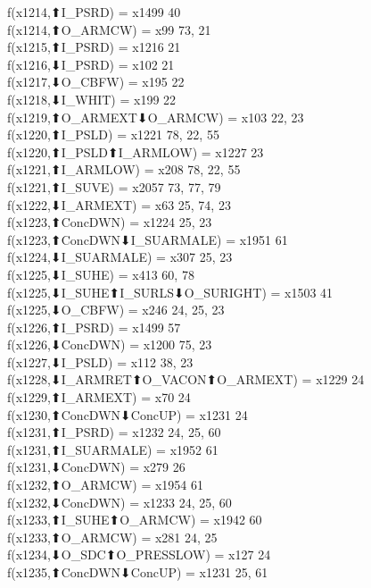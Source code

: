 f(x1214,⬆I_PSRD) = x1499 {40} \\
f(x1214,⬆O_ARMCW) = x99 {73, 21} \\
f(x1215,⬆I_PSRD) = x1216 {21} \\
f(x1216,⬇I_PSRD) = x102 {21} \\
f(x1217,⬇O_CBFW) = x195 {22} \\
f(x1218,⬇I_WHIT) = x199 {22} \\
f(x1219,⬆O_ARMEXT⬇O_ARMCW) = x103 {22, 23} \\
f(x1220,⬆I_PSLD) = x1221 {78, 22, 55} \\
f(x1220,⬆I_PSLD⬆I_ARMLOW) = x1227 {23} \\
f(x1221,⬆I_ARMLOW) = x208 {78, 22, 55} \\
f(x1221,⬆I_SUVE) = x2057 {73, 77, 79} \\
f(x1222,⬇I_ARMEXT) = x63 {25, 74, 23} \\
f(x1223,⬆ConcDWN) = x1224 {25, 23} \\
f(x1223,⬆ConcDWN⬇I_SUARMALE) = x1951 {61} \\
f(x1224,⬇I_SUARMALE) = x307 {25, 23} \\
f(x1225,⬇I_SUHE) = x413 {60, 78} \\
f(x1225,⬇I_SUHE⬆I_SURLS⬇O_SURIGHT) = x1503 {41} \\
f(x1225,⬇O_CBFW) = x246 {24, 25, 23} \\
f(x1226,⬆I_PSRD) = x1499 {57} \\
f(x1226,⬇ConcDWN) = x1200 {75, 23} \\
f(x1227,⬇I_PSLD) = x112 {38, 23} \\
f(x1228,⬇I_ARMRET⬆O_VACON⬆O_ARMEXT) = x1229 {24} \\
f(x1229,⬆I_ARMEXT) = x70 {24} \\
f(x1230,⬆ConcDWN⬇ConcUP) = x1231 {24} \\
f(x1231,⬆I_PSRD) = x1232 {24, 25, 60} \\
f(x1231,⬆I_SUARMALE) = x1952 {61} \\
f(x1231,⬇ConcDWN) = x279 {26} \\
f(x1232,⬆O_ARMCW) = x1954 {61} \\
f(x1232,⬇ConcDWN) = x1233 {24, 25, 60} \\
f(x1233,⬆I_SUHE⬆O_ARMCW) = x1942 {60} \\
f(x1233,⬆O_ARMCW) = x281 {24, 25} \\
f(x1234,⬇O_SDC⬆O_PRESSLOW) = x127 {24} \\
f(x1235,⬆ConcDWN⬇ConcUP) = x1231 {25, 61} \\
